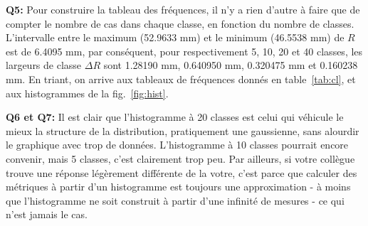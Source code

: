 \textbf{Q5:} Pour construire la tableau des fréquences, il n'y a rien d'autre à faire que de compter le nombre de cas dans chaque classe, en fonction du nombre de classes. L'intervalle entre le maximum (52.9633 mm) et le minimum (46.5538 mm) de $R$ est de 6.4095 mm, par conséquent, pour respectivement 5, 10, 20 et 40 classes, les largeurs de classe $\Delta R$ sont 1.28190 mm, 0.640950 mm, 0.320475 mm et 0.160238 mm. En triant, on arrive aux tableaux de fréquences donnés en table~\ref{tab:cl}, et aux histogrammes de la fig.~\ref{fig:hist}.

\textbf{Q6 et Q7:} Il est clair que l'histogramme à 20 classes est celui qui véhicule le mieux la structure de la distribution, pratiquement une gaussienne, sans alourdir le graphique avec trop de données. L'histogramme à 10 classes pourrait encore convenir, mais 5 classes, c'est clairement trop peu. Par ailleurs, si votre collègue trouve une réponse légèrement différente de la votre, c'est parce que calculer des métriques à partir d'un histogramme est toujours une approximation - à moins que l'histogramme ne soit construit à partir d'une infinité de mesures - ce qui n'est jamais le cas.

